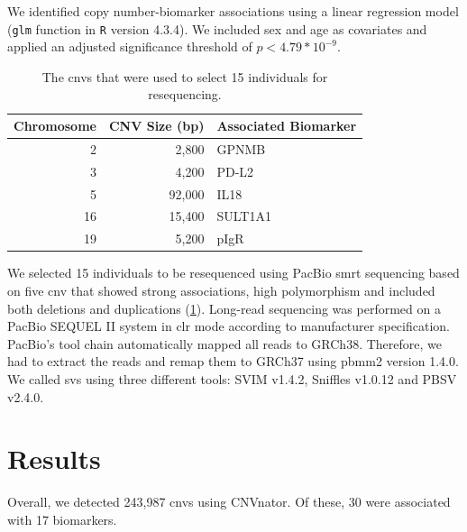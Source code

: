 \documentclass[draft]{scrbook}
\begin{document}
We identified copy number-biomarker associations using a linear regression model (\texttt{glm} function in \texttt{R} version 4.3.4).
We included sex and age as covariates and applied an adjusted significance threshold of \(p < 4.79*10^{-9}\).

\begin{table}
    \centering
    \begin{tabular}{r r l}
        \toprule
        \textbf{Chromosome} & \textbf{CNV Size (bp)} & \textbf{Associated Biomarker} \\
        \midrule
        2 & 2,800 & GPNMB \\
        3 & 4,200 & PD-L2 \\
        5 & 92,000 & IL18 \\
        16 & 15,400 & SULT1A1 \\
        19 & 5,200 & pIgR \\
        \bottomrule
    \end{tabular}
    \caption{The \glspl{cnv} that were used to select 15 individuals for resequencing.}
    \label{tab:primecnvs}
\end{table}

We selected 15 individuals to be resequenced using PacBio \gls{smrt} sequencing based on five \gls{cnv} that showed strong associations, high polymorphism and included both deletions and duplications (\cref{tab:primecnvs}).
Long-read sequencing was performed on a PacBio SEQUEL II system in \gls{clr} mode according to manufacturer specification.
PacBio's tool chain automatically mapped all reads to GRCh38.
Therefore, we had to extract the reads and remap them to GRCh37 using \textsf{pbmm2} version 1.4.0.
We called \glspl{sv} using three different tools: \textsf{SVIM} v1.4.2, \textsf{Sniffles} v1.0.12 and \textsf{PBSV} v2.4.0.

\section{Results}
Overall, we detected 243,987 \glspl{cnv} using \textsf{CNVnator}.
Of these, 30 were associated with 17 biomarkers.
\end{document}
